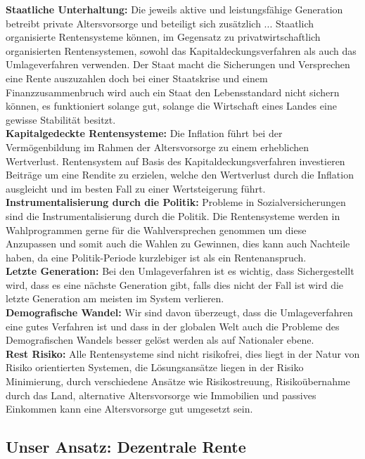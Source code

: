 \textbf{Staatliche Unterhaltung:} Die jeweils aktive und leistungsfähige Generation betreibt private Altersvorsorge und beteiligt sich zusätzlich ...
Staatlich organisierte Rentensysteme können, im Gegensatz zu privatwirtschaftlich organisierten Rentensystemen, sowohl das Kapitaldeckungsverfahren als auch das Umlageverfahren verwenden. 
Der Staat macht die Sicherungen und Versprechen eine Rente auszuzahlen doch bei einer Staatskrise und einem Finanzzusammenbruch wird auch ein Staat den Lebensstandard nicht sichern können, es funktioniert solange gut, solange die Wirtschaft eines Landes eine gewisse Stabilität besitzt.\\
\textbf{Kapitalgedeckte Rentensysteme:} Die Inflation führt bei der Vermögenbildung im Rahmen der Altersvorsorge zu einem erheblichen Wertverlust. 
Rentensystem auf Basis des Kapitaldeckungsverfahren investieren Beiträge um eine Rendite zu erzielen, welche den Wertverlust durch die Inflation ausgleicht und im besten Fall zu einer Wertsteigerung führt. \\
\textbf{Instrumentalisierung durch die Politik:} Probleme in Sozialversicherungen sind die Instrumentalisierung durch die Politik.
Die Rentensysteme werden in Wahlprogrammen gerne für die Wahlversprechen genommen um diese Anzupassen und somit auch die Wahlen zu Gewinnen, dies kann auch Nachteile haben, da eine Politik-Periode kurzlebiger ist als ein Rentenanspruch. \\
\textbf{Letzte Generation:} Bei den Umlageverfahren ist es wichtig, dass Sichergestellt wird, dass es eine nächste Generation gibt, falls dies nicht der Fall ist wird die letzte Generation am meisten im System verlieren.\\
\textbf{Demografische Wandel:} Wir sind davon überzeugt, dass die Umlageverfahren eine gutes Verfahren ist und dass in der globalen Welt auch die Probleme des Demografischen Wandels besser gelöst werden als auf Nationaler ebene. \\
\textbf{Rest Risiko:} Alle Rentensysteme sind nicht risikofrei, dies liegt in der Natur von Risiko orientierten Systemen, die Lösungsansätze liegen in der Risiko Minimierung, durch verschiedene Ansätze wie Risikostreuung, Risikoübernahme durch das Land, alternative Altersvorsorge wie Immobilien und passives Einkommen kann eine Altersvorsorge gut umgesetzt sein.


\subsection{Unser Ansatz: Dezentrale Rente}

